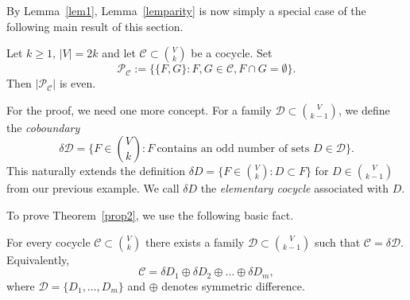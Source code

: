 \documentclass[english,a4paper,nolineno]{lipics-v2019}
\newcommand{\R}{\mathbb{R}}
\newcommand{\nula}{\mathbf{0}}
\begin{document}



By Lemma~\ref{lem1}, Lemma~\ref{lemparity} is now simply a special case of the following main result of this section.

\begin{theorem}\label{prop2} Let $k\ge 1$, $|V|=2k$ and let $\mathcal C\subset {V\choose k}$ be a cocycle. Set    $$\mathcal P_{\mathcal C}:=\big\{\{F,G\}: F,G\in \mathcal C, F\cap G=\emptyset \big\}.$$
Then $|\mathcal P_{\mathcal C}|$ is even.
\end{theorem}


For the proof, we need one more concept. For a family $\mathcal D\subset {V\choose k-1}$, we define the \emph{coboundary} 
\[\delta\mathcal D=\big\{F\in {V\choose k}: F\ \text{contains an odd number of sets }D\in \mathcal D\big\}.\] This naturally extends the definition $\delta D=\{F\in {V\choose k}: D\subset F\}$ for $D\in {V\choose k-1}$ from our previous example. We call $\delta D$ the \emph{elementary cocycle} associated with $D$. 

To prove Theorem~\ref{prop2}, we use the following basic fact.

\begin{lemma}\label{lem2}
For every cocycle $\mathcal C\subset {V\choose k}$ there exists a family $\mathcal D\subset {V\choose k-1}$ such that
$\mathcal C=\delta\mathcal D$.
Equivalently,
$$\mathcal C=\delta D_1\oplus\delta D_2\oplus \ldots \oplus \delta D_m,$$
where $\mathcal D=\{D_1,\ldots, D_m\}$ and $\oplus$ denotes symmetric difference.  
\end{lemma}
\end{document}
